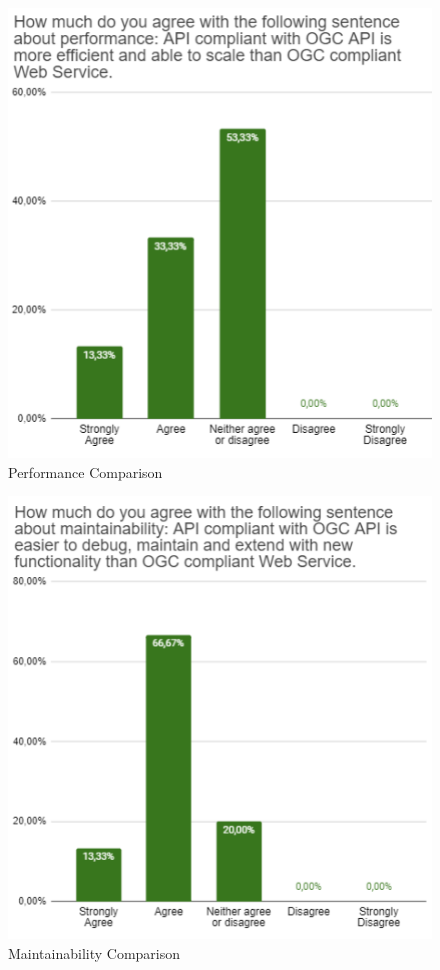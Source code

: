 \begin{figure}[H]
     \centering
     \includegraphics[scale=0.9]{img/performance.png}
     \caption{Performance Comparison}
     \label{fig:performance}
\end{figure}

\begin{figure}[H]
     \centering
     \includegraphics[scale=0.8]{img/maintain.png}
     \caption{Maintainability Comparison}
     \label{fig:maintain}
\end{figure}

